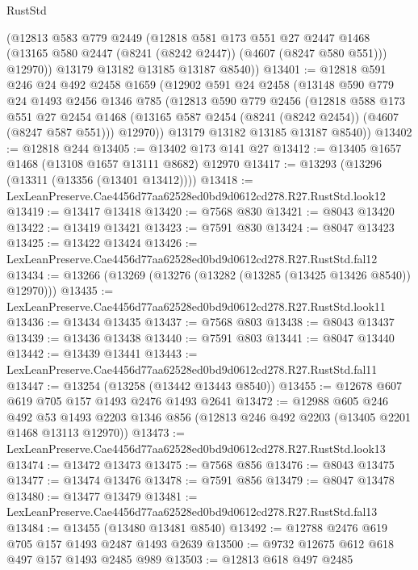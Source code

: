 \begin{lexlean}{RustStd}
\begin{coremodule}
        (@12813
          @583
          @779
          @2449
          (@12818
            @581
            @173
            @551
            @27
            @2447
            @1468
            (@13165 @580 @2447 (@8241 (@8242 @2447)) (@4607 (@8247 @580 @551)))
            @12970))
        @13179
        @13182
        @13185
        @13187
        @8540))
@13401 := @12818
    @591
    @246
    @24
    @492
    @2458
    @1659
    (@12902
      @591
      @24
      @2458
      (@13148
        @590
        @779
        @24
        @1493
        @2456
        @1346
        @785
        (@12813
          @590
          @779
          @2456
          (@12818
            @588
            @173
            @551
            @27
            @2454
            @1468
            (@13165 @587 @2454 (@8241 (@8242 @2454)) (@4607 (@8247 @587 @551)))
            @12970))
        @13179
        @13182
        @13185
        @13187
        @8540))
@13402 := @12818 @244
@13405 := @13402 @173 @141 @27
@13412 := @13405 @1657 @1468 (@13108 @1657 @13111 @8682) @12970
@13417 := @13293 (@13296 (@13311 (@13356 (@13401 @13412))))
@13418 := LexLeanPreserve.Cae4456d77aa62528ed0bd9d0612cd278.R27.RustStd.look12
@13419 := @13417 @13418
@13420 := @7568 @830
@13421 := @8043 @13420
@13422 := @13419 @13421
@13423 := @7591 @830
@13424 := @8047 @13423
@13425 := @13422 @13424
@13426 := LexLeanPreserve.Cae4456d77aa62528ed0bd9d0612cd278.R27.RustStd.fal12
@13434 := @13266 (@13269 (@13276 (@13282 (@13285 (@13425 @13426 @8540)) @12970)))
@13435 := LexLeanPreserve.Cae4456d77aa62528ed0bd9d0612cd278.R27.RustStd.look11
@13436 := @13434 @13435
@13437 := @7568 @803
@13438 := @8043 @13437
@13439 := @13436 @13438
@13440 := @7591 @803
@13441 := @8047 @13440
@13442 := @13439 @13441
@13443 := LexLeanPreserve.Cae4456d77aa62528ed0bd9d0612cd278.R27.RustStd.fal11
@13447 := @13254 (@13258 (@13442 @13443 @8540))
@13455 := @12678 @607 @619 @705 @157 @1493 @2476 @1493 @2641
@13472 := @12988
    @605
    @246
    @492
    @53
    @1493
    @2203
    @1346
    @856
    (@12813 @246 @492 @2203 (@13405 @2201 @1468 @13113 @12970))
@13473 := LexLeanPreserve.Cae4456d77aa62528ed0bd9d0612cd278.R27.RustStd.look13
@13474 := @13472 @13473
@13475 := @7568 @856
@13476 := @8043 @13475
@13477 := @13474 @13476
@13478 := @7591 @856
@13479 := @8047 @13478
@13480 := @13477 @13479
@13481 := LexLeanPreserve.Cae4456d77aa62528ed0bd9d0612cd278.R27.RustStd.fal13
@13484 := @13455 (@13480 @13481 @8540)
@13492 := @12788 @2476 @619 @705 @157 @1493 @2487 @1493 @2639
@13500 := @9732 @12675 @612 @618 @497 @157 @1493 @2485 @989
@13503 := @12813 @618 @497 @2485

\end{coremodule}
\end{lexlean}
